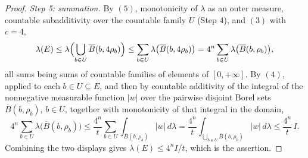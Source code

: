 \begin{proof}
\emph{Step 5: summation.}
By $(5)$, monotonicity of $\lambda$ as an outer measure, countable
subadditivity over the countable family $U$ (Step 4), and $(3)$ with $c = 4$,
\[
  \lambda(E)
    \leq \lambda\Bigl(\bigcup_{b\in U}\overline B(b,4\rho_b)\Bigr)
    \leq \sum_{b\in U}\lambda\bigl(\overline B(b,4\rho_b)\bigr)
    = 4^n\sum_{b\in U}\lambda\bigl(\overline B(b,\rho_b)\bigr) ,
\]
all sums being sums of countable families of elements of $[0,+\infty]$.  By
$(4)$, applied to each $b \in U \subseteq E$, and then by countable additivity
of the integral of the nonnegative measurable function $|w|$ over the pairwise
disjoint Borel sets $\overline B(b,\rho_b)$, $b \in U$, together with
monotonicity of that integral in the domain,
\[
  4^n\sum_{b\in U}\lambda\bigl(\overline B(b,\rho_b)\bigr)
    \leq \frac{4^n}{t}\sum_{b\in U}\int_{\overline B(b,\rho_b)}|w|\,d\lambda
    = \frac{4^n}{t}\int_{\bigcup_{b\in U}\overline B(b,\rho_b)}|w|\,d\lambda
    \leq \frac{4^n}{t}\,I .
\]
Combining the two displays gives $\lambda(E) \leq 4^nI/t$, which is the
assertion.
\end{proof}
